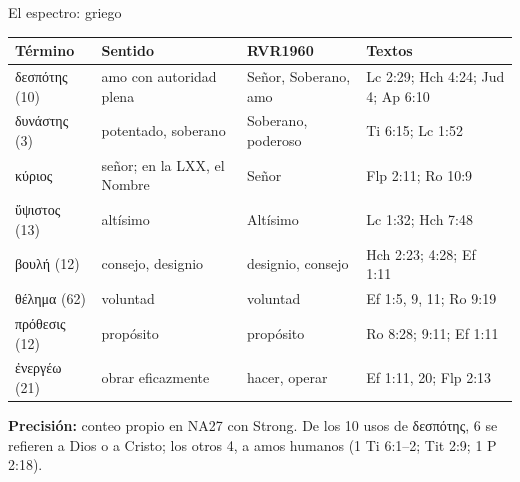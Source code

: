 \documentclass[hyperref={bookmarks=false},aspectratio=169]{beamer}
\newcommand{\grc}[1]{\foreignlanguage{ancientgreek}{#1}}
\newcommand{\precision}[1]{{\footnotesize\color{gris}\textbf{Precisión:} #1}}
\begin{document}
\begin{frame}{El espectro: griego}
\scriptsize\renewcommand{\arraystretch}{1.12}
\begin{tabular}{@{}>{\RaggedRight\arraybackslash}p{2.6cm}>{\RaggedRight\arraybackslash}p{3.0cm}>{\RaggedRight\arraybackslash}p{2.6cm}>{\RaggedRight\arraybackslash}p{3.5cm}@{}}
\toprule
\textbf{Término} & \textbf{Sentido} & \textbf{RVR1960} & \textbf{Textos} \\ \midrule
\grc{δεσπότης} (10) & amo con autoridad plena & Señor, Soberano, amo & Lc 2:29; Hch 4:24; Jud 4; Ap 6:10 \\
\grc{δυνάστης} (3) & potentado, soberano & Soberano, poderoso & 1 Ti 6:15; Lc 1:52 \\
\grc{κύριος} & señor; en la LXX, el Nombre & Señor & Flp 2:11; Ro 10:9 \\
\grc{ὕψιστος} (13) & altísimo & Altísimo & Lc 1:32; Hch 7:48 \\
\grc{βουλή} (12) & consejo, designio & designio, consejo & Hch 2:23; 4:28; Ef 1:11 \\
\grc{θέλημα} (62) & voluntad & voluntad & Ef 1:5, 9, 11; Ro 9:19 \\
\grc{πρόθεσις} (12) & propósito & propósito & Ro 8:28; 9:11; Ef 1:11 \\
\grc{ἐνεργέω} (21) & obrar eficazmente & hacer, operar & Ef 1:11, 20; Flp 2:13 \\
\bottomrule
\end{tabular}\par\medskip
\precision{conteo propio en NA27 con Strong. De los 10 usos de \grc{δεσπότης}, 6 se refieren a Dios o a Cristo; los otros 4, a amos humanos (1 Ti 6:1--2; Tit 2:9; 1 P 2:18).}
\end{frame}
\end{document}

